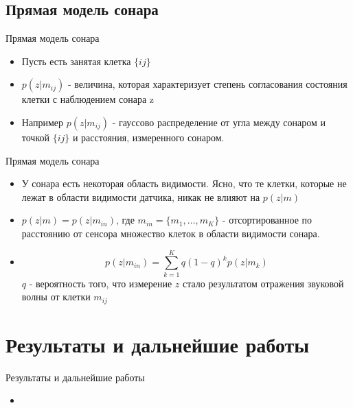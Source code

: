 \documentclass[9pt]{beamer}
\begin{document}
\subsection{Прямая модель сонара}

\begin{frame}{Прямая модель сонара}
\begin{itemize}
  \item
  {
    Пусть есть занятая клетка $\{ij\}$
  }
  \item
  {
    $p(z|m_{ij})$ - величина, которая характеризует степень согласования состояния клетки с наблюдением сонара z 
  }
  \item
  {
    Например $p(z|m_{ij})$ - гауссово распределение от угла между сонаром и точкой $\{ij\}$ и расстояния, измеренного сонаром.
  }
\end{itemize}
\end{frame}

\begin{frame}{Прямая модель сонара}
\begin{itemize}
  \item
  {
    У сонара есть некоторая область видимости. Ясно, что те клетки, которые не лежат в области видимости датчика, никак не влияют на $p(z|m)$
  }
  \item
  {
    $p(z|m) = p(z|m_{in})$, где $m_{in} = \{ m_1, ..., m_K\}$ - отсортированное по расстоянию от сенсора множество клеток в области видимости сонара.
  }
  \item
  {
    $$p(z|m_{in}) = \sum_{k=1}^K{q (1-q)^k p(z|m_{k})}$$
    $q$ - вероятность того, что измерение $z$ стало результатом отражения звуковой волны от клетки $m_{ij}$
  }
\end{itemize}
\end{frame}



\section{Результаты и дальнейшие работы}
\begin{frame}{Результаты и дальнейшие работы}
\begin{itemize}
  \item
  {
    
  }
  \end{itemize}
\end{frame}

      
\end{document}
